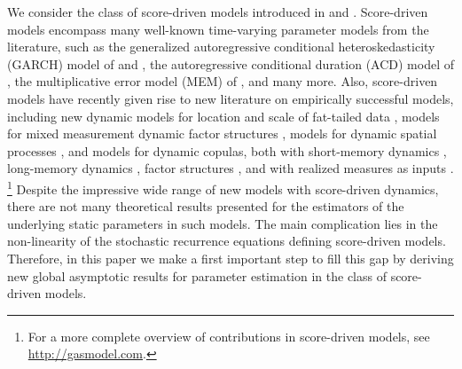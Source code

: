 \noindent  We consider the class of score-driven models introduced in \citet{CKL2011,CKL2013} and \citet{harvey2013}. 
Score-driven models encompass many well-known time-varying parameter models from the literature, such as the generalized autoregressive conditional heteroskedasticity (GARCH) model of \citet{Engle82A} and \citet{Bollerslev86}, the autoregressive conditional duration (ACD) model of \citet{EngleRussell1998}, the multiplicative error model (MEM) of \cite{Engle2002}, and many more. 
Also, score-driven models have recently given rise to 
new literature on empirically successful models, including 
new dynamic models for location and scale of fat-tailed data \citep{harveyluati2014}, 
models for mixed measurement dynamic factor structures \citep{cskl2014},
models for dynamic spatial processes \citep{blasques2016,catania2017},
and 
models for dynamic copulas, 
both with short-memory dynamics \citep{CKL2011, lucasschwaabzhang2014, lucasschwaabzhang2017},
long-memory dynamics \citep{jkl2014}, 
factor structures \citep{ohpatton2017b},
and with realized measures as inputs \citep{delirasalvatierrapatton2015,opschoor2017}.%
\footnote{%
	For a more complete overview of contributions in score-driven models, see \href{http://gasmodel.com}{http://gasmodel.com}.
} %
Despite the impressive wide range of new models with score-driven dynamics, 
there are not many theoretical results presented
for the estimators of the underlying static parameters in such models. The main complication lies in the non-linearity of the stochastic recurrence equations defining score-driven models. Therefore, in this paper we make a first important step to fill this gap by deriving new global asymptotic results for parameter estimation in the class of score-driven models.

